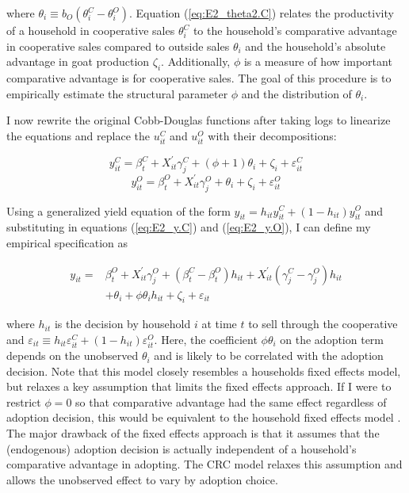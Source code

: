 \documentclass[11pt]{article}
\begin{document}
where $\theta_{i} \equiv b_{O}(\theta^{C}_{i} - \theta^{O}_{i})$. Equation (\ref{eq:E2_theta2.C}) relates the productivity of a household in cooperative sales $\theta^{C}_{i}$ to the household’s comparative advantage in cooperative sales compared to outside sales $\theta_{i}$ and the household’s absolute advantage in goat production $\zeta_i$. Additionally, $\phi$ is a measure of how important comparative advantage is for cooperative sales. The goal of this procedure is to empirically estimate the structural parameter $\phi$ and the distribution of $\theta_{i}$.

I now rewrite the original Cobb-Douglas functions after taking logs to linearize the equations and replace the $u^{C}_{it}$ and $u^{O}_{it}$ with their decompositions:

\begin{equation} \label{eq:E2_y.C}
    y^{C}_{it} = \beta^{C}_{t} + X^{\prime}_{it}\gamma^{C}_{j} + (\phi + 1)\theta_{i} + \zeta_i + \varepsilon^{C}_{it}
\end{equation}
\begin{equation} \label{eq:E2_y.O}
    y^{O}_{it} = \beta^{O}_{t} + X^{\prime}_{it}\gamma^{O}_{j} + \theta_{i} + \zeta_i + \varepsilon^{O}_{it}
\end{equation}

Using a generalized yield equation of the form $y_{it} = h_{it}y^{C}_{it} + (1-h_{it})y^{O}_{it}$ and substituting in equations (\ref{eq:E2_y.C}) and (\ref{eq:E2_y.O}), I can define my empirical specification as

\begin{equation} \label{eq:E2_spec}
    \begin{split}
    y_{it} = & \beta^{O}_{t} + X^{\prime}_{it}\gamma^{O}_{j} + (\beta^{C}_{t} - \beta^{O}_{t})h_{it} +  X^{\prime}_{it}(\gamma^{C}_{j} - \gamma^{O}_{j})h_{it} \\
    & + \theta_{i} + \phi\theta_{i}h_{it} + \zeta_i + \varepsilon_{it}
    \end{split}
\end{equation}

where $h_{it}$ is the decision by household $i$ at time $t$ to sell through the cooperative and $\varepsilon_{it} \equiv h_{it}\varepsilon^{C}_{it} + (1-h_{it})\varepsilon^{O}_{it}$. Here, the coefficient $\phi\theta_{i}$ on the adoption term depends on the unobserved $\theta_{i}$ and is likely to be correlated with the adoption decision. Note that this model closely resembles a households fixed effects model, but relaxes a key assumption that limits the fixed effects approach. If I were to restrict $\phi = 0$ so that comparative advantage had the same effect regardless of adoption decision, this would be equivalent to the household fixed effects model \citep{suri11}. The major drawback of the fixed effects approach is that it assumes that the (endogenous) adoption decision is actually independent of a household’s comparative advantage in adopting. The CRC model relaxes this assumption and allows the unobserved effect to vary by adoption choice.
\end{document}
